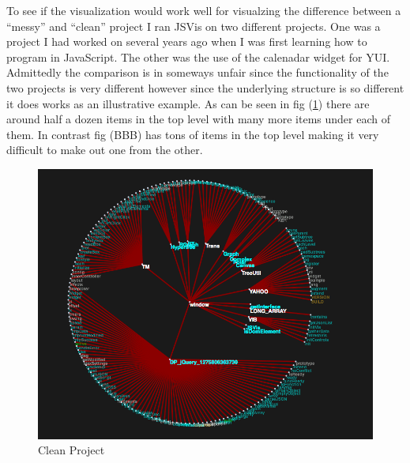 \documentclass{article}
\begin{document}
To see if the visualization would work well for visualzing the difference between a ``messy'' and ``clean'' project I ran JSVis on two different projects. One was a project I had worked on several years ago when I was first learning how to program in JavaScript. The other was the use of the calenadar widget for YUI. Admittedly the comparison is in someways unfair since the functionality of the two projects is very different however since the underlying structure is so different it does works as an illustrative example. As can be seen in fig (\ref{fig:clean}) there are around half a dozen items in the top level with many more items under each of them. In contrast fig (BBB) has tons of items in the top level making it very difficult to make out one from the other.

\begin{figure}[clean]
  \begin{center}
    \includegraphics[scale=.5]{clean.png}
  \end{center}
  \caption{Clean Project}
  \label{fig:clean}
\end{figure}
\end{document}
